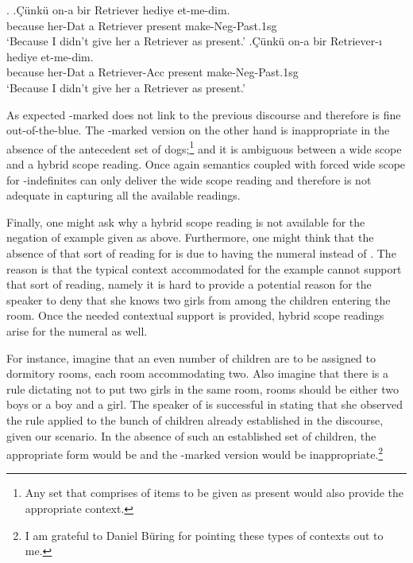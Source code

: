 \documentclass[11pt,a4paper]{article}
\begin{document}
\ex.
\ag.\label{exretz}Çünkü on-a bir Retriever hediye et-me-dim.\\
 because her-Dat a Retriever present make-Neg-Past.1sg\\
`Because I didn't give her a Retriever as present.'
\bg.\label{exreta}Çünkü on-a bir Retriever-ı hediye et-me-dim.\\ 
because her-Dat a Retriever-Acc present make-Neg-Past.1sg\\
`Because I didn't give her a Retriever as present.'


As expected \zero-marked  does not link to the previous
discourse and therefore is fine out-of-the-blue. The \acc-marked
version  on the other hand is inappropriate in the
absence of the antecedent set of dogs;\footnote{Any set that comprises
of items to be given as present would also provide the appropriate
context.} and it is ambiguous between a wide scope and a hybrid scope
reading. Once again  semantics coupled with forced wide
scope for \acc-indefinites can only deliver the wide scope reading and
therefore is not adequate in capturing all the available readings.

Finally, one might ask why a hybrid scope reading is not available for
the negation of  example given as 
above.  Furthermore, one might think that the absence of that sort of
reading for  is due to having the numeral
 instead of . The reason is that the
typical context accommodated for the example cannot support that sort
of reading, namely it is hard to provide a potential reason for the
speaker to deny that she knows two girls from among the children
entering the room. Once the needed contextual support is provided,
hybrid scope readings arise for the numeral  as well.

For instance, imagine that an even number of children are to be
assigned to dormitory rooms, each room accommodating two. Also imagine
that there is a rule dictating not to put two girls in the same room,
rooms should be either two boys or a boy and a girl. The speaker of
 is successful in stating that she observed the rule
applied to the bunch of children already established in the discourse,
given our scenario. In the absence of such an established set of
children, the appropriate form would be  and the
\acc-marked version  would be inappropriate.\footnote{I am
		grateful to Daniel Büring for pointing these types of contexts
out to me.} 
\end{document}
